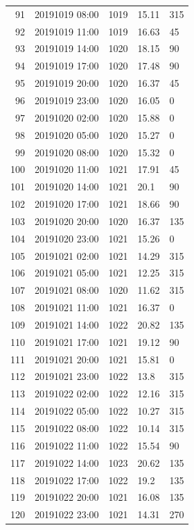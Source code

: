 \documentclass{article}\usepackage[]{graphicx}\usepackage[]{color}
\begin{document}
\begin{tabular}{rllll}
  91 & 20191019 08:00 & 1019 & 15.11 & 315 \\ 
  92 & 20191019 11:00 & 1019 & 16.63 & 45 \\ 
  93 & 20191019 14:00 & 1020 & 18.15 & 90 \\ 
  94 & 20191019 17:00 & 1020 & 17.48 & 90 \\ 
  95 & 20191019 20:00 & 1020 & 16.37 & 45 \\ 
  96 & 20191019 23:00 & 1020 & 16.05 & 0 \\ 
  97 & 20191020 02:00 & 1020 & 15.88 & 0 \\ 
  98 & 20191020 05:00 & 1020 & 15.27 & 0 \\ 
  99 & 20191020 08:00 & 1020 & 15.32 & 0 \\ 
  100 & 20191020 11:00 & 1021 & 17.91 & 45 \\ 
  101 & 20191020 14:00 & 1021 & 20.1 & 90 \\ 
  102 & 20191020 17:00 & 1021 & 18.66 & 90 \\ 
  103 & 20191020 20:00 & 1020 & 16.37 & 135 \\ 
  104 & 20191020 23:00 & 1021 & 15.26 & 0 \\ 
  105 & 20191021 02:00 & 1021 & 14.29 & 315 \\ 
  106 & 20191021 05:00 & 1021 & 12.25 & 315 \\ 
  107 & 20191021 08:00 & 1020 & 11.62 & 315 \\ 
  108 & 20191021 11:00 & 1021 & 16.37 & 0 \\ 
  109 & 20191021 14:00 & 1022 & 20.82 & 135 \\ 
  110 & 20191021 17:00 & 1021 & 19.12 & 90 \\ 
  111 & 20191021 20:00 & 1021 & 15.81 & 0 \\ 
  112 & 20191021 23:00 & 1022 & 13.8 & 315 \\ 
  113 & 20191022 02:00 & 1022 & 12.16 & 315 \\ 
  114 & 20191022 05:00 & 1022 & 10.27 & 315 \\ 
  115 & 20191022 08:00 & 1022 & 10.14 & 315 \\ 
  116 & 20191022 11:00 & 1022 & 15.54 & 90 \\ 
  117 & 20191022 14:00 & 1023 & 20.62 & 135 \\ 
  118 & 20191022 17:00 & 1022 & 19.2 & 135 \\ 
  119 & 20191022 20:00 & 1021 & 16.08 & 135 \\ 
  120 & 20191022 23:00 & 1021 & 14.31 & 270 \\ 

\end{tabular}
\end{document}
